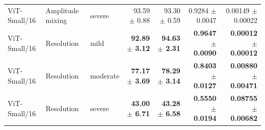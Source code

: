 \begin{tabular}{lllrrrr}
ViT-Small/16 & Amplitude mixing & severe & 93.59 $\pm$ 0.88 & 93.30 $\pm$ 0.59 & 0.9284 $\pm$ 0.0047 & 0.00149 $\pm$ 0.00022 \\
ViT-Small/16 & Resolution & mild & \textbf{92.89 $\pm$ 3.12} & \textbf{94.63 $\pm$ 2.31} & \textbf{0.9647 $\pm$ 0.0090} & \textbf{0.00012 $\pm$ 0.00012} \\
ViT-Small/16 & Resolution & moderate & \textbf{77.17 $\pm$ 3.69} & \textbf{78.29 $\pm$ 3.14} & \textbf{0.8403 $\pm$ 0.0127} & \textbf{0.00880 $\pm$ 0.00471} \\
ViT-Small/16 & Resolution & severe & \textbf{43.00 $\pm$ 6.71} & \textbf{43.28 $\pm$ 6.58} & \textbf{0.5550 $\pm$ 0.0194} & \textbf{0.08755 $\pm$ 0.00682} \\
\bottomrule
\end{tabular}
